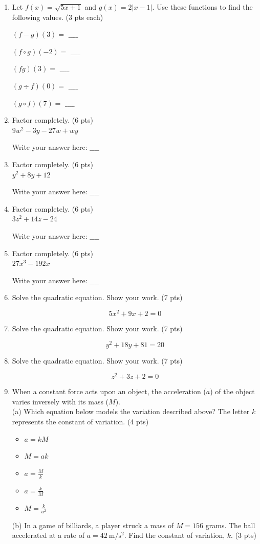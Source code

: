 \documentclass{ximera}
\begin{document}
\begin{enumerate}
\item Let $f(x)=\sqrt{5 x+1}$ and $g(x)=2|x-1|$. Use these functions to find the following values. (3 pts each)

$(f-g)(3)=$ $\_\_\_\_$

$(f \circ g)(-2)=$ $\_\_\_\_$

$(f g)(3)=$ $\_\_\_\_$

$(g \div f)(0)=$ $\_\_\_\_$

$(g \circ f)(7)=$ $\_\_\_\_$

\item Factor completely. (6 pts)\\
$9 w^{2}-3 y-27 w+w y$

Write your answer here: $\_\_\_\_$

\item Factor completely. (6 pts)\\
$y^{2}+8 y+12$

Write your answer here: $\_\_\_\_$

\item Factor completely. (6 pts)\\
$3 z^{2}+14 z-24$

Write your answer here: $\_\_\_\_$

\item Factor completely. (6 pts)\\
$27 x^{3}-192 x$

Write your answer here: $\_\_\_\_$

\item Solve the quadratic equation. Show your work. (7 pts)

$$5 x^{2}+9 x+2=0$$

\item Solve the quadratic equation. Show your work. (7 pts)

$$y^{2}+18 y+81=20$$

\item Solve the quadratic equation. Show your work. (7 pts)

$$z^{2}+3 z+2=0$$

\item When a constant force acts upon an object, the acceleration ($a$) of the object varies inversely with its mass ($M$).\\
(a) Which equation below models the variation described above? The letter $k$ represents the constant of variation. (4 pts)\\
\begin{itemize}
\item $a=k M$
\item $M=a k$
\item $a=\frac{M}{k}$
\item $a=\frac{k}{M}$
\item $M=\frac{k}{a^{2}}$
\end{itemize}
(b) In a game of billiards, a player struck a mass of $M=156$ grams. The ball accelerated at a rate of $a=42 \mathrm{~m} / \mathrm{s}^{2}$. Find the constant of variation, $k$. (3 pts)


\end{enumerate}
\end{document}
